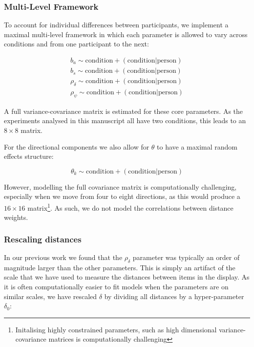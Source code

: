 \documentclass[man, floatsintext]{apa7}
\begin{document}
\subsubsection{Multi-Level Framework}

To account for individual differences between participants, we implement a maximal multi-level framework in which each parameter is allowed to vary across conditions and from one participant to the next:

\begin{eqnarray}
b_a \sim \text{condition} + (\text{condition} | \text{person}) \\
b_s \sim \text{condition} + (\text{condition} | \text{person}) \\
\rho_{\delta} \sim \text{condition} + (\text{condition} | \text{person})\\
\rho_{\psi} \sim \text{condition} + (\text{condition} | \text{person})
\end{eqnarray}

A full variance-covariance matrix is estimated for these core parameters.  As the experiments analysed in this manuscript all have two conditions, this leads to an $8\times8$ matrix. 

For the directional components we also allow for $\theta$ to have a maximal random effects structure: 

\begin{equation}
\theta_k \sim \text{condition} + (\text{condition} | \text{person})
\end{equation}

However, modelling the full covariance matrix is computationally challenging, especially when we move from four to eight directions, as this would produce a $16\times 16$ matrix\footnote{Initalising highly constrained parameters, such as high dimensional variance-covariance matrices is computationally challenging}. As such, we do not model the correlations between distance weights. 

\subsubsection{Rescaling distances}

In our previous work we found that the $\rho_{\delta}$ parameter was typically an order of magnitude larger than the other parameters. This is simply an artifact of the scale that we have used to measure the distances between items in the display. As it is often computationally easier to fit models when the parameters are on similar scales, we have rescaled $\delta$ by dividing all distances by a hyper-parameter $\delta_0$:
\end{document}
